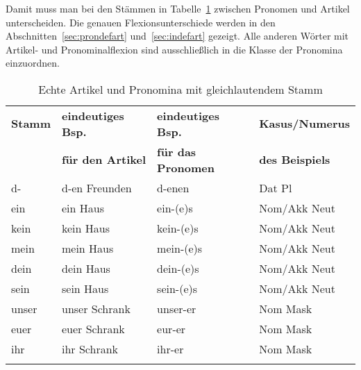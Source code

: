 

Damit muss man bei den Stämmen in Tabelle~\ref{tab:art} zwischen Pronomen und Artikel unterscheiden.
Die genauen Flexionsunterschiede werden in den Abschnitten~\ref{sec:prondefart} und~\ref{sec:indefart} gezeigt.
Alle anderen Wörter mit Artikel- und Pronominalflexion sind ausschließlich in die Klasse der Pronomina einzuordnen.

\begin{table}[!htbp]
  \centering
  \begin{tabular}{llll}
    \lsptoprule
    \textbf{Stamm} & \textbf{eindeutiges Bsp.} & \textbf{eindeutiges Bsp.} & \textbf{Kasus\slash Numerus} \\
    & \textbf{für den Artikel} & \textbf{für das Pronomen} & \textbf{des Beispiels} \\
    \midrule
    d- & d-en Freunden & d-enen & Dat Pl \\
    ein & ein Haus & ein-(e)s & Nom/Akk Neut \\
    kein & kein Haus & kein-(e)s & Nom/Akk Neut \\
    mein & mein Haus & mein-(e)s & Nom/Akk Neut \\
    dein & dein Haus & dein-(e)s & Nom/Akk Neut \\
    sein & sein Haus & sein-(e)s & Nom/Akk Neut \\
    unser & unser Schrank & unser-er & Nom Mask \\
    euer & euer Schrank & eur-er & Nom Mask \\
    ihr & ihr Schrank & ihr-er & Nom Mask \\
    \lspbottomrule
  \end{tabular}
  \caption{Echte Artikel und Pronomina mit gleichlautendem Stamm}
  \label{tab:art}
\end{table}


